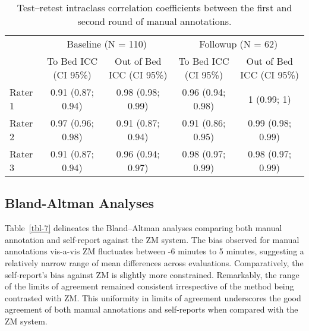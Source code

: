 \documentclass[
  10pt,
]{scrbook}
\begin{document}
\footnotesize

\hypertarget{tbl-man_icc_test_retest}{}
\begin{longtable}{lcccc}
\caption{\label{tbl-man_icc_test_retest}Test--retest intraclass correlation coefficients between the first and
second round of manual annotations. }\tabularnewline

\toprule
 & \multicolumn{2}{c}{Baseline (N = 110)} & \multicolumn{2}{c}{Followup (N = 62)} \\ 
\cmidrule(lr){2-3} \cmidrule(lr){4-5}
 & To Bed
ICC (CI 95\%) & Out of Bed
ICC (CI 95\%) & To Bed
ICC (CI 95\%) & Out of Bed
ICC (CI 95\%) \\ 
\midrule
Rater 1 & 0.91 (0.87; 0.94) & 0.98 (0.98; 0.99) & 0.96 (0.94; 0.98) & 1 (0.99; 1) \\ 
Rater 2 & 0.97 (0.96; 0.98) & 0.91 (0.87; 0.94) & 0.91 (0.86; 0.95) & 0.99 (0.98; 0.99) \\ 
Rater 3 & 0.91 (0.87; 0.94) & 0.96 (0.94; 0.97) & 0.98 (0.97; 0.99) & 0.98 (0.97; 0.99) \\ 
\bottomrule
\end{longtable}

\endgroup

\hypertarget{bland-altman-analyses}{%
\subsection{Bland-Altman Analyses}\label{bland-altman-analyses}}

Table~\ref{tbl-7} delineates the Bland--Altman analyses comparing both
manual annotation and self-report against the ZM system. The bias
observed for manual annotations vis-a-vis ZM fluctuates between -6
minutes to 5 minutes, suggesting a relatively narrow range of mean
differences across evaluations. Comparatively, the self-report's bias
against ZM is slightly more constrained. Remarkably, the range of the
limits of agreement remained consistent irrespective of the method being
contrasted with ZM. This uniformity in limits of agreement underscores
the good agreement of both manual annotations and self-reports when
compared with the ZM system.

\begingroup

\footnotesize
\end{document}
